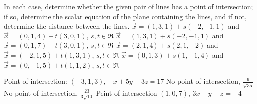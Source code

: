
\begin{Exercise}[
name={},
title={}, 
difficulty=0,
origin={\cite{SM}}]
In each case, determine whether the given pair of lines has a point of intersection; if so, determine the scalar equation of the plane containing the lines, and if not, determine the distance between the lines.
\Question $\vec{x} = (1,3,1) + s(-2,-1,1)$ and $\vec{x}=(0,1,4)+t(3,0,1)$, $s,t\in\Re$
\Question $\vec{x} = (1,3,1) + s(-2,-1,1)$ and $\vec{x}=(0,1,7)+t(3,0,1)$, $s,t\in\Re$
\Question $\vec{x} = (2,1,4)+s(2,1,-2)$ and $\vec{x}=(-2,1,5)+t(1,3,1)$, $s,t\in\Re$
\Question $\vec{x} = (0,1,3)+s(1,-1,4)$ and $\vec{x}=(0,-1,5)+t(1,1,2)$, $s,t\in\Re$
\end{Exercise}

\begin{Answer}
\Question Point of intersection: $(-3,1,3)$, $-x+5y+3z=17$
\Question No point of intersection, $\frac{9}{\sqrt{35}}$
\Question No point of intersection, $\frac{23}{3\sqrt{10}}$
\Question Point of intersection $(1,0,7)$, $3x-y-z=-4$
\end{Answer}

